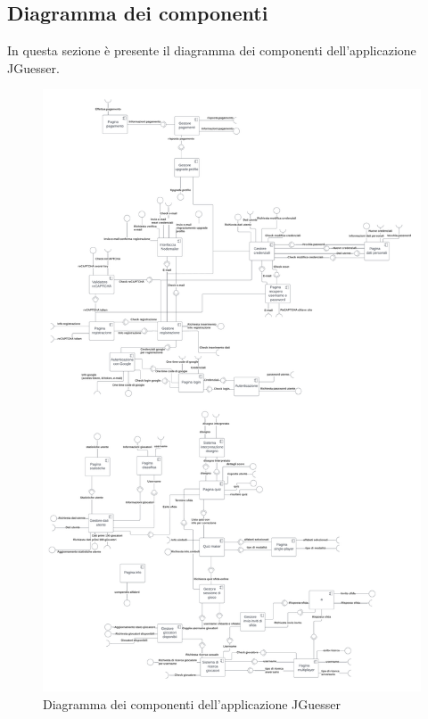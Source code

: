 \subsection{Diagramma dei componenti}
In questa sezione è presente il diagramma dei componenti dell'applicazione JGuesser. \\
\begin{figure}[!h]
\centering
\includegraphics[scale=0.081]{images/diagramma_dei_componenti.png}
\caption{Diagramma dei componenti dell'applicazione JGuesser}
\label{fig:diagramma_dei_componenti}
\end{figure}
\noindent



